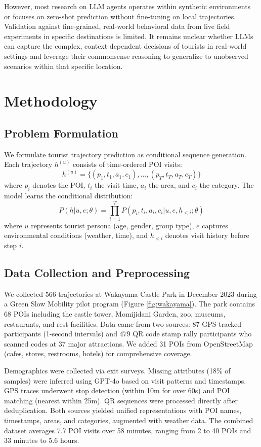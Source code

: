 \documentclass[letterpaper]{article}
\begin{document}
However, most research on LLM agents operates within synthetic environments or focuses on zero-shot prediction without fine-tuning on local trajectories.
Validation against fine-grained, real-world behavioral data from live field experiments in specific destinations is limited. It remains unclear whether LLMs can capture the complex, context-dependent decisions of tourists in real-world settings and leverage their commonsense reasoning to generalize to unobserved scenarios within that specific location.

\section{Methodology}

\subsection{Problem Formulation}

We formulate tourist trajectory prediction as conditional sequence generation. Each trajectory $h^{(u)}$ consists of time-ordered POI visits:
$$h^{(u)} = \{(p_1, t_1, a_1, c_1), \ldots, (p_T, t_T, a_T, c_T)\}$$
where $p_i$ denotes the POI, $t_i$ the visit time, $a_i$ the area, and $c_i$ the category. The model learns the conditional distribution:
$$P(h|u,e;\theta) = \prod_{i=1}^{T} P(p_i, t_i, a_i, c_i | u, e, h_{<i}; \theta)$$
where $u$ represents tourist persona (age, gender, group type), $e$ captures environmental conditions (weather, time), and $h_{<i}$ denotes visit history before step $i$.

\subsection{Data Collection and Preprocessing}

We collected 566 trajectories at Wakayama Castle Park in December 2023 during a Green Slow Mobility pilot program (Figure \ref{fig:wakayama}). The park contains 68 POIs including the castle tower, Momijidani Garden, zoo, museums, restaurants, and rest facilities. Data came from two sources: 87 GPS-tracked participants (1-second intervals) and 479 QR code stamp rally participants who scanned codes at 37 major attractions. We added 31 POIs from OpenStreetMap (cafes, stores, restrooms, hotels) for comprehensive coverage.

Demographics were collected via exit surveys. Missing attributes (18\% of samples) were inferred using GPT-4o based on visit patterns and timestamps. GPS traces underwent stop detection (within 10m for over 60s) and POI matching (nearest within 25m). QR sequences were processed directly after deduplication. Both sources yielded unified representations with POI names, timestamps, areas, and categories, augmented with weather data. The combined dataset averages 7.7 POI visits over 58 minutes, ranging from 2 to 40 POIs and 33 minutes to 5.6 hours.
\end{document}
